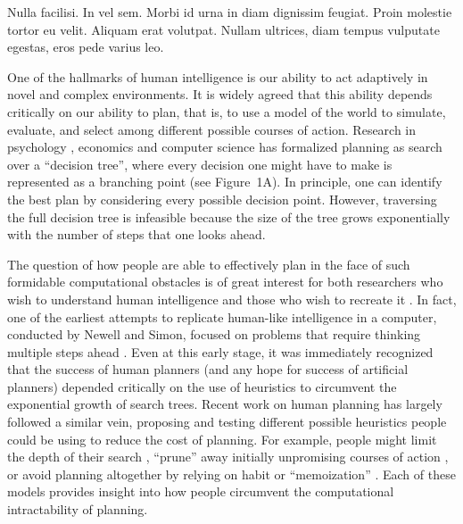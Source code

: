 \begin{savequote}[75mm]
Nulla facilisi. In vel sem. Morbi id urna in diam dignissim feugiat. Proin molestie tortor eu velit. Aliquam erat volutpat. Nullam ultrices, diam tempus vulputate egestas, eros pede varius leo.
\end{savequote}

\label{sec:planning}

One of the hallmarks of human intelligence is our ability to act adaptively in novel and complex environments. It is widely agreed that this ability depends critically on our ability to plan, that is, to use a model of the world to simulate, evaluate, and select among different possible courses of action. Research in psychology \citep{huys2015interplay,huys2012bonsai,vanopheusden2017computational,macgregor2001information,keramati2016adaptive,krusche2018adaptive,snider2015prospective}, economics \citep{vonneumann1944theory,stahl1994experimental,camerer2004cognitive} and computer science \citep{newell1956logic} has formalized planning as search over a ``decision tree'', where every decision one might have to make is represented as a branching point (see Figure~1A). In principle, one can identify the best plan by considering every possible decision point. However, traversing the full decision tree is infeasible because the size of the tree grows exponentially with the number of steps that one looks ahead. 

The question of how people are able to effectively plan in the face of such formidable computational obstacles is of great interest for both researchers who wish to understand human intelligence and those who wish to recreate it \citep{griffiths2019doing}. In fact, one of the earliest attempts to replicate human-like intelligence in a computer, conducted by Newell and Simon, focused on problems that require thinking multiple steps ahead \citep{newell1956logic,newell1959report,newell1972human}. Even at this early stage, it was immediately recognized that the success of human planners (and any hope for success of artificial planners) depended critically on the use of heuristics to circumvent the exponential growth of search trees. Recent work on human planning has largely followed a similar vein, proposing and testing different possible heuristics people could be using to reduce the cost of planning. For example, people might limit the depth of their search \citep{macgregor2001information,keramati2016adaptive,krusche2018adaptive,snider2015prospective}, ``prune'' away initially unpromising courses of action \citep{huys2012bonsai,huys2015interplay}, or avoid planning altogether by relying on habit or ``memoization'' \citep{huys2015interplay,kool2017costbenefit}. Each of these models provides insight into how people circumvent the computational intractability of planning. 


